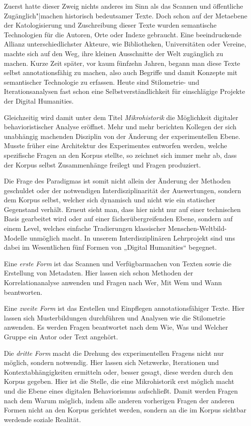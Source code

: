 \documentclass[a4paper,11pt]{article}
\begin{document}
Zuerst hatte dieser Zweig nichts anderes im Sinn als das Scannen und
öffentliche Zugänglich"|machen historisch bedeutsamer Texte. Doch schon auf der
Metaebene der Katologisierung und Zuschreibung dieser Texte wurden semantische
Technologien für die Autoren, Orte oder Indexe gebraucht. Eine beeindruckende
Allianz unterschiedlichster Akteure, wie Bibliotheken, Universitäten oder
Vereine, machte sich auf den Weg, ihre kleinen Ausschnitte der Welt zugänglich
zu machen. Kurze Zeit später, vor kaum fünfzehn Jahren, begann man diese Texte
selbst annotationsfähig zu machen, also auch Begriffe und damit Konzepte mit
semantischer Technologie zu erfassen. Heute sind Stilometrie- und
Iterationsanalysen fast schon eine Selbstverständlichkeit für einschlägige
Projekte der Digital Humanities.

Gleichzeitig wird damit unter dem Titel \emph{Mikrohistorik} die Möglichkeit
digitaler behavioristischer Analyse eröffnet. Mehr und mehr berichten Kollegen
der sich unabhängig machenden Disziplin von der Änderung der experimentellen
Ebene. Musste früher eine Architektur des Experimentes entworfen werden,
welche spezifische Fragen an den Korpus stellte, so zeichnet sich immer mehr
ab, dass der Korpus selbst Zusammenhänge freilegt und Fragen produziert.

Die Frage des Paradigmas ist somit nicht allein der Änderung der Methoden
geschuldet oder der notwendigen Interdisziplinarität der Auswertungen, sondern
dem Korpus selbst, welcher sich dynamisch und nicht wie ein statischer
Gegenstand verhält. Erneut sieht man, dass hier nicht nur auf einer
technischen Basis gearbeitet wird oder auf einer fächerübergreifenden Ebene,
sondern auf einem Level, welches einfache Tradierungen klassischer
Menschen-Weltbild-Modelle unmöglich macht.  In unserem Interdisziplinären
Lehrprojekt sind uns dabei im Wesentlichen fünf Formen von „Digital
Humanities“ begegnet.

Eine \emph{erste Form} ist das Scannen und Verfügbarmachen von Texten sowie
die Erstellung von Metadaten. Hier lassen sich schon Methoden der
Korrelationanalyse anwenden und Fragen nach Wer, Mit Wem und Wann beantworten.

Eine \emph{zweite Form} ist das Erstellen und Einpflegen annotationsfähiger
Texte. Hier lassen sich Musterbildungen durchführen und Analysen wie die
Stilometrie anwenden. Es werden Fragen beantwortet nach dem Wie, Was und
Welcher Gruppe ein Autor oder Text angehört.

Die \emph{dritte Form} macht die Drehung des experimentellen Fragens nicht nur
möglich, sondern notwendig. Hier lassen sich Netzwerke, Iterationen und
Kontextabhängigkeiten ermitteln oder, besser gesagt, diese werden durch den
Korpus gegeben. Hier ist die Stelle, die eine Mikrohistorik erst möglich macht
und die Ebene eines digitalen Behaviorismus aufschließt. Damit werden Fragen
nach dem Warum möglich, indem alle anderen vorherigen Fragen der anderen Formen
nicht an den Korpus gerichtet werden, sondern an die im Korpus sichtbar
werdende soziale Realität.
\end{document}
